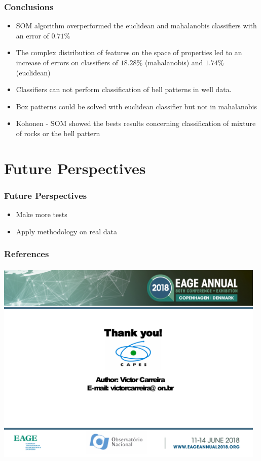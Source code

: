 \documentclass[aspectratio=10]{beamer} %
\begin{document}
\begin{frame}
	\frametitle{Conclusions}
	\begin{itemize}
		\item SOM algorithm overperformed the euclidean and mahalanobis classifiers with an error of $0.71\%$
		\pause
		\item The complex distribution of features on the space of properties led to an increase of errors on classifiers of $18.28\%$ (mahalanobis) and $1.74\%$ (euclidean)
		\pause
		\item Classifiers can not perform classification of bell patterns in well data. 
		\pause
		\item Box patterns could be solved with euclidean classifier but not in mahalanobis
		\pause
		\item Kohonen - SOM showed the bests results concerning classification of mixture of rocks or the bell pattern
	\end{itemize}
\end{frame}

\section{Future Perspectives}

\begin{frame}
	\frametitle{Future Perspectives}
	\begin{itemize}
		\pause
		\item Make more tests
		\pause
		\item Apply methodology on real data
	\end{itemize}
\end{frame}


\begin{frame}[allowframebreaks]
\frametitle{References}
\tiny


\end{frame}

\begin{frame}
\flushbottom
\setlength{\parskip}{-1ex plus 1ex }
\setlength{\parindent}{-15pt}
\includegraphics[width=13cm,height=10cm]{Imagens/end.pdf}
\end{frame}
\end{document}
